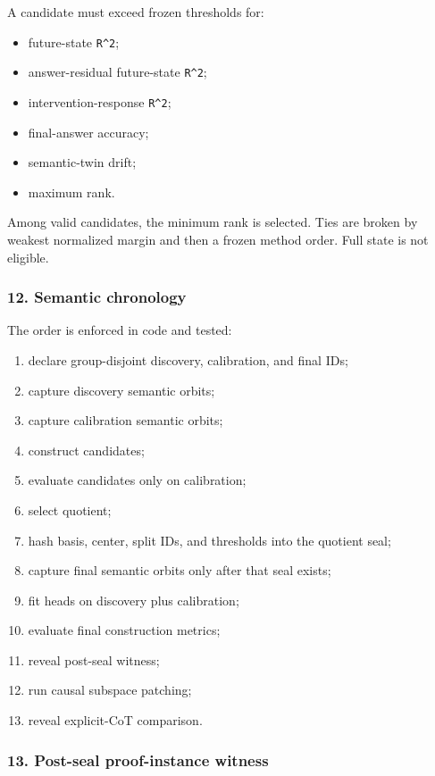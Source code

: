 \documentclass[
  10pt,
]{article}
\providecommand{\tightlist}{%
  \setlength{\itemsep}{0pt}\setlength{\parskip}{0pt}}
\begin{document}
A candidate must exceed frozen thresholds for:

\begin{itemize}
\tightlist
\item
  future-state \texttt{R\^{}2};
\item
  answer-residual future-state \texttt{R\^{}2};
\item
  intervention-response \texttt{R\^{}2};
\item
  final-answer accuracy;
\item
  semantic-twin drift;
\item
  maximum rank.
\end{itemize}

Among valid candidates, the minimum rank is selected. Ties are broken by
weakest normalized margin and then a frozen method order. Full state is
not eligible.

\subsubsection{12. Semantic chronology}\label{semantic-chronology}

The order is enforced in code and tested:

\begin{enumerate}
\def\labelenumi{\arabic{enumi}.}
\tightlist
\item
  declare group-disjoint discovery, calibration, and final IDs;
\item
  capture discovery semantic orbits;
\item
  capture calibration semantic orbits;
\item
  construct candidates;
\item
  evaluate candidates only on calibration;
\item
  select quotient;
\item
  hash basis, center, split IDs, and thresholds into the quotient seal;
\item
  capture final semantic orbits only after that seal exists;
\item
  fit heads on discovery plus calibration;
\item
  evaluate final construction metrics;
\item
  reveal post-seal witness;
\item
  run causal subspace patching;
\item
  reveal explicit-CoT comparison.
\end{enumerate}

\subsubsection{13. Post-seal proof-instance
witness}\label{post-seal-proof-instance-witness}
\end{document}
